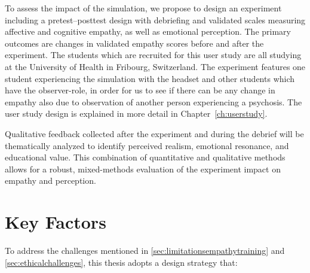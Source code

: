 To assess the impact of the simulation, we propose to design an experiment including a pretest–posttest design with debriefing and validated scales measuring affective and cognitive empathy, as well as emotional perception. The primary outcomes are changes in validated empathy scores before and after the experiment. The students which are recruited for this user study are all studying at the University of Health in Fribourg, Switzerland. The experiment features one student experiencing the simulation with the headset and other students which have the observer-role, in order for us to see if there can be any change in empathy also due to observation of another person experiencing a psychosis. The user study design is explained in more detail in Chapter~\ref{ch:userstudy}.

\vspace{1em}

Qualitative feedback collected after the experiment and during the debrief will be thematically analyzed to identify perceived realism, emotional resonance, and educational value. This combination of quantitative and qualitative methods allows for a robust, mixed-methods evaluation of the experiment impact on empathy and perception.

\vspace{1em}

\section{Key Factors}
To address the challenges mentioned in \ref{sec:limitationsempathytraining} and \ref{sec:ethicalchallenges}, this thesis adopts a design strategy that:

